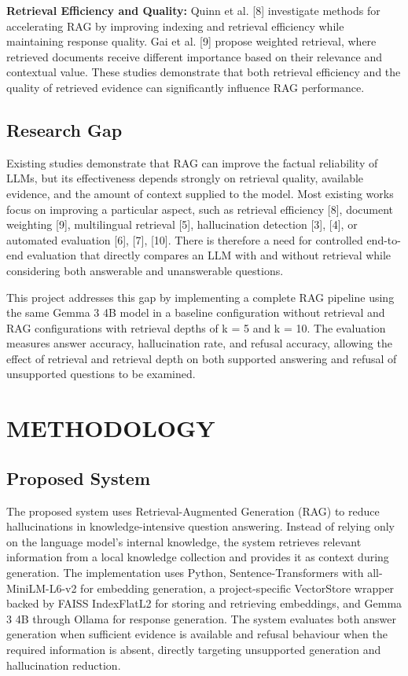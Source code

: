 \documentclass[conference]{IEEEtran}
\begin{document}
\textbf{Retrieval Efficiency and Quality:} Quinn et al. [8] investigate methods for accelerating RAG by improving indexing and retrieval efficiency while maintaining response quality. Gai et al. [9] propose weighted retrieval, where retrieved documents receive different importance based on their relevance and contextual value. These studies demonstrate that both retrieval efficiency and the quality of retrieved evidence can significantly influence RAG performance.

\subsection{Research Gap}
Existing studies demonstrate that RAG can improve the factual reliability of LLMs, but its effectiveness depends strongly on retrieval quality, available evidence, and the amount of context supplied to the model. Most existing works focus on improving a particular aspect, such as retrieval efficiency [8], document weighting [9], multilingual retrieval [5], hallucination detection [3], [4], or automated evaluation [6], [7], [10]. There is therefore a need for controlled end-to-end evaluation that directly compares an LLM with and without retrieval while considering both answerable and unanswerable questions.

This project addresses this gap by implementing a complete RAG pipeline using the same Gemma 3 4B model in a baseline configuration without retrieval and RAG configurations with retrieval depths of k = 5 and k = 10. The evaluation measures answer accuracy, hallucination rate, and refusal accuracy, allowing the effect of retrieval and retrieval depth on both supported answering and refusal of unsupported questions to be examined.

\section{METHODOLOGY}
\subsection{Proposed System}
The proposed system uses Retrieval-Augmented Generation (RAG) to reduce hallucinations in knowledge-intensive question answering. Instead of relying only on the language model's internal knowledge, the system retrieves relevant information from a local knowledge collection and provides it as context during generation. The implementation uses Python, Sentence-Transformers with all-MiniLM-L6-v2 for embedding generation, a project-specific VectorStore wrapper backed by FAISS IndexFlatL2 for storing and retrieving embeddings, and Gemma 3 4B through Ollama for response generation. The system evaluates both answer generation when sufficient evidence is available and refusal behaviour when the required information is absent, directly targeting unsupported generation and hallucination reduction.
\end{document}
